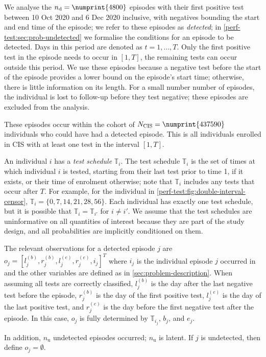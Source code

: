 \documentclass[12pt]{article}
\newcommand{\ndet}{n_\text{d}}
\newcommand{\nnodet}{n_\text{u}}
\newcommand{\Ncis}{N_\text{CIS}}
\newcommand{\sched}{\mathbb{T}}
\begin{document}
We analyse the $\ndet = \numprint{4800}$ episodes with their first positive test between 10 Oct 2020 and 6 Dec 2020 inclusive, with negatives bounding the start and end time of the episode; we refer to these episodes as \emph{detected}; in \cref{perf-test:sec:prob-undetected} we formalise the conditions for an episode to be detected.
Days in this period are denoted as $t = 1, \dots, T$.
Only the first positive test in the episode needs to occur in $[1, T]$, the remaining tests can occur outside this period.
We use these episodes because a negative test before the start of the episode provides a lower bound on the episode's start time; otherwise, there is little information on its length.
For a small number number of episodes, the individual is lost to follow-up before they test negative; these episodes are excluded from the analysis.

These episodes occur within the cohort of $\Ncis = \numprint{437590}$ individuals who could have had a detected episode.
This is all individuals enrolled in CIS with at least one test in the interval $[1, T]$.

An individual $i$ has a \emph{test schedule} $\sched_i$.
The test schedule $\sched_i$ is the set of times at which individual $i$ is tested, starting from their last test prior to time 1, if it exists, or their time of enrolment otherwise; note that $\sched_i$ includes any tests that occur after $T$.
For example, for the individual in \cref{perf-test:fig:double-interval-censor}, $\sched_i = \{ 0, 7, 14, 21, 28, 56 \}$.
Each individual has exactly one test schedule, but it is possible that $\sched_i = \sched_{i'}$ for $i \neq i'$.
We assume that the test schedules are uninformative on all quantities of interest because they are part of the study design, and all probabilities are implicitly conditioned on them.

The relevant observations for a detected episode $j$ are $o_j = [l_j^{(b)}, r_j^{(b)}, l_j^{(e)}, r_j^{(e)}, i_j]^T$ where $i_j$ is the individual episode $j$ occurred in and the other variables are defined as in \cref{sec:problem-description}.
When assuming all tests are correctly classified, $l_j^{(b)}$ is the day after the last negative test before the episode, $r_j^{(b)}$ is the day of the first positive test, $l_j^{(e)}$ is the day of the last positive test, and $r_j^{(e)}$ is the day before the first negative test after the episode.
In this case, $o_j$ is fully determined by $\sched_{i_j}$, $b_j$, and $e_j$.

In addition, $\nnodet$ undetected episodes occurred; $\nnodet$ is latent.
If $j$ is undetected, then define $o_j = \emptyset$.
\end{document}
